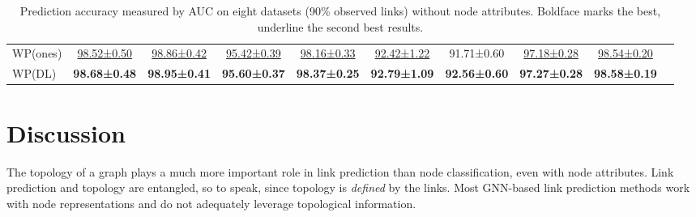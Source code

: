 \documentclass[11pt]{article}
\newcommand{\first}[1]{\textbf{#1}}
\newcommand{\second}[1]{\underline{#1}}
\begin{document}
\begin{table}[!]
{\begin{tabular}{@{}lccccccccc@{}}
\midrule
WP(ones) &\second{98.52±0.50} & \second{98.86±0.42} & \second{95.42±0.39} & \second{98.16±0.33} & \second{92.42±1.22} & 91.71±0.60 &\second{97.18±0.28} & \second{98.54±0.20}\\
WP(DL) &\first{98.68±0.48} & \first{98.95±0.41} & \first{95.60±0.37} & \first{98.37±0.25} & \first{92.79±1.09} & \first{92.56±0.60} & \first{97.27±0.28} &\first{98.58±0.19}\\
\bottomrule
\end{tabular}
}
\caption{Prediction accuracy measured by AUC on eight datasets (90\% observed links) without node attributes. Boldface marks the best, underline the second best results.}
\label{tab1}
\vspace{-1mm}
\end{table}
\addtolength{\tabcolsep}{3pt}

\vspace{-2mm}
\section{Discussion}
\vspace{-1mm}
The topology of a graph plays a much more important role in link prediction than node classification, even with node attributes. Link prediction and topology are entangled, so to speak, since topology is \textit{defined} by the links. Most GNN-based link prediction methods work with node representations and do not adequately leverage topological information. 
\end{document}
